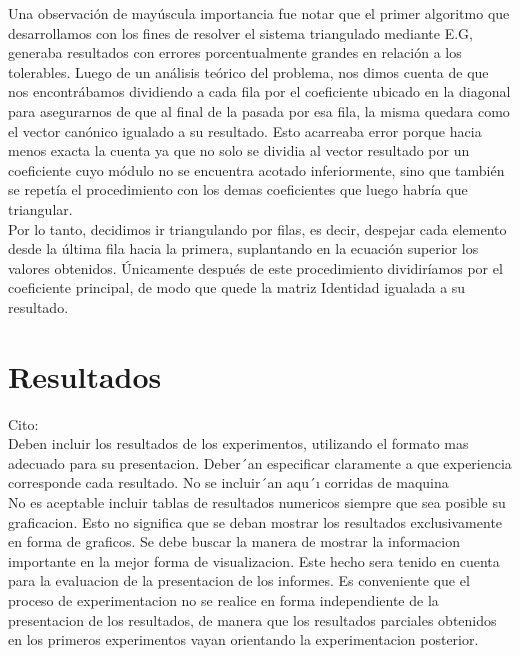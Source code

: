 \documentclass[double, 1.5in, 12pt]{beavtex}
\begin{document}
Una observaci\'on de may\'uscula importancia fue notar que el primer algoritmo que desarrollamos con los fines de resolver el sistema triangulado mediante E.G, generaba resultados con errores porcentualmente grandes en relaci\'on a los tolerables. Luego de un an\'alisis te\'orico del problema, nos dimos cuenta de que nos encontr\'abamos dividiendo a cada fila por el coeficiente ubicado en la diagonal para asegurarnos de que al final de la pasada por esa fila, la misma quedara como el vector can\'onico igualado a su resultado. Esto acarreaba error porque hacia menos exacta la cuenta ya que no solo se dividia al vector resultado por un coeficiente cuyo m\'odulo no se encuentra acotado inferiormente, sino que tambi\'en se repet\'ia el procedimiento con los demas coeficientes que luego habr\'ia que triangular. \\
Por lo tanto, decidimos ir triangulando por filas, es decir, despejar cada elemento desde la \'ultima fila hacia la primera, suplantando en la ecuaci\'on superior los valores obtenidos. \'Unicamente despu\'es de este procedimiento dividir\'iamos por el coeficiente principal, de modo que quede la matriz Identidad igualada a su resultado. \\





\chapter{Resultados}

Cito: \\

Deben incluir los resultados de los experimentos, utilizando el formato mas adecuado
para su presentacion. Deber´an especificar claramente a que experiencia corresponde
cada resultado. No se incluir´an aqu´ı corridas de maquina\\
No es aceptable incluir tablas de resultados numericos siempre que sea posible su
graficacion. 
Esto no significa que se deban mostrar los resultados exclusivamente en forma de graficos.
Se debe buscar la manera de mostrar la informacion importante en la mejor forma de visualizacion. Este hecho sera tenido en cuenta para la evaluacion de la presentacion de los informes.
Es conveniente que el proceso de experimentacion no se realice en forma independiente
de la presentacion de los resultados, de manera que los resultados parciales obtenidos en
los primeros experimentos vayan orientando la experimentacion posterior.
\end{document}
